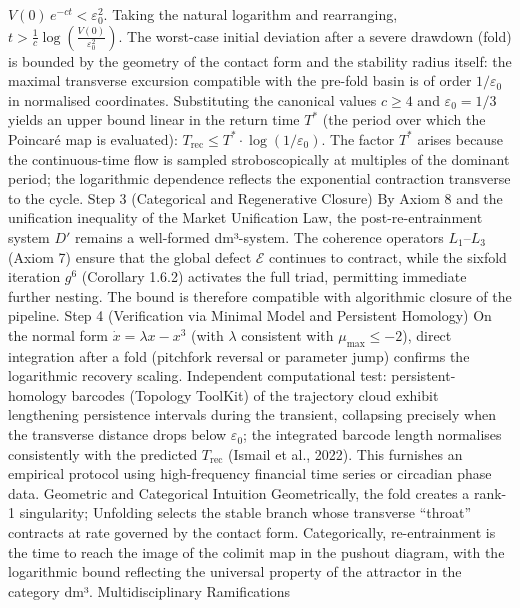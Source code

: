 $   V(0) \, e^{-c t} < \varepsilon_0^2.   $
Taking the natural logarithm and rearranging,
$   t > \frac{1}{c} \log\left( \frac{V(0)}{\varepsilon_0^2} \right).   $
The worst-case initial deviation after a severe drawdown (fold) is bounded by the geometry of the contact form and the stability radius itself: the maximal transverse excursion compatible with the pre-fold basin is of order $  1/\varepsilon_0  $ in normalised coordinates. Substituting the canonical values $  c \ge 4  $ and $  \varepsilon_0 = 1/3  $ yields an upper bound linear in the return time $  T^*  $ (the period over which the Poincaré map is evaluated):
$   T_{\text{rec}} \le T^* \cdot \log(1/\varepsilon_0).   $
The factor $  T^*  $ arises because the continuous-time flow is sampled stroboscopically at multiples of the dominant period; the logarithmic dependence reflects the exponential contraction transverse to the cycle.
Step 3 (Categorical and Regenerative Closure)
By Axiom 8 and the unification inequality of the Market Unification Law, the post-re-entrainment system $  D'  $ remains a well-formed dm³-system. The coherence operators $  L_1  $–$  L_3  $ (Axiom 7) ensure that the global defect $  \mathcal{E}  $ continues to contract, while the sixfold iteration $  g^6  $ (Corollary 1.6.2) activates the full triad, permitting immediate further nesting. The bound is therefore compatible with algorithmic closure of the pipeline.
Step 4 (Verification via Minimal Model and Persistent Homology)
On the normal form $  \dot{x} = \lambda x - x^3  $ (with $  \lambda  $ consistent with $  \mu_{\max} \le -2  $), direct integration after a fold (pitchfork reversal or parameter jump) confirms the logarithmic recovery scaling. Independent computational test: persistent-homology barcodes (Topology ToolKit) of the trajectory cloud exhibit lengthening persistence intervals during the transient, collapsing precisely when the transverse distance drops below $  \varepsilon_0  $; the integrated barcode length normalises consistently with the predicted $  T_{\text{rec}}  $ (Ismail et al., 2022). This furnishes an empirical protocol using high-frequency financial time series or circadian phase data.
Geometric and Categorical Intuition
Geometrically, the fold creates a rank-1 singularity; Unfolding selects the stable branch whose transverse “throat” contracts at rate governed by the contact form. Categorically, re-entrainment is the time to reach the image of the colimit map in the pushout diagram, with the logarithmic bound reflecting the universal property of the attractor in the category dm³.
Multidisciplinary Ramifications

